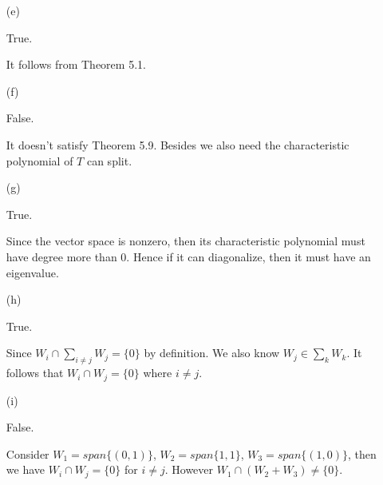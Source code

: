 \begin{Exercise}
\begin{enumerate}[(a)]
\item[(e)]
\begin{answer}
True.
\end{answer}
\begin{solution}
It follows from Theorem 5.1.
\end{solution}

\item[(f)]
\begin{answer}
False.
\end{answer}
\begin{solution}
It doesn't satisfy Theorem 5.9. Besides we also need the characteristic polynomial of $T$ can split.
\end{solution}

\item[(g)]
\begin{answer}
True.
\end{answer}
\begin{solution}
Since the vector space is nonzero, then its characteristic polynomial must have degree more than $0$. Hence if it can diagonalize, then it must have an eigenvalue.
\end{solution}

\item[(h)]
\begin{answer}
True.
\end{answer}
\begin{solution}
Since $W_i\cap \sum_{i\neq j} W_j = \{0\}$ by definition. We also know $W_j \in \sum_{k} W_k$. It follows that $W_i \cap W_j =\{0\}$ where $i\neq j$.
\end{solution}

\item[(i)]
\begin{answer}
False.
\end{answer}
\begin{solution}
Consider $W_1 = span\{(0,1)\}$, $W_2 = span\{1,1\}$, $W_3 = span\{(1,0)\}$, then we have $W_i\cap W_j = \{0\}$ for $i\neq j$. However $W_1\cap (W_2+W_3) \neq \{0\}$.
\end{solution}

\end{enumerate}
\end{Exercise}